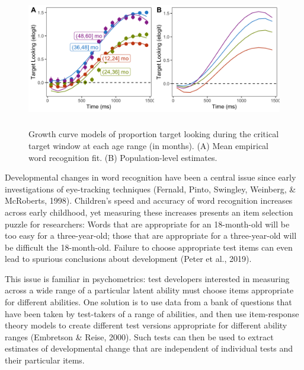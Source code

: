 \documentclass[10pt, letterpaper]{article}
\begin{document}
\begin{figure} 
\includegraphics[width=14cm,height=6cm]{../figures/age_gca.png}
\caption{Growth curve models of proportion target looking during the critical target window at each age range (in months). (A) Mean empirical word recognition fit. (B) Population-level estimates.}
\label{fig:age_gca}
\end{figure}

Developmental changes in word recognition have been a central issue
since early investigations of eye-tracking techniques (Fernald, Pinto,
Swingley, Weinberg, \& McRoberts, 1998). Children's speed and accuracy
of word recognition increases across early childhood, yet measuring
these increases presents an item selection puzzle for researchers: Words
that are appropriate for an 18-month-old will be too easy for a
three-year-old; those that are appropriate for a three-year-old will be
difficult the 18-month-old. Failure to choose appropriate test items can
even lead to spurious conclusions about development (Peter et al.,
2019).

This issue is familiar in psychometrics: test developers interested in
measuring across a wide range of a particular latent ability must choose
items appropriate for different abilities. One solution is to use data
from a bank of questions that have been taken by test-takers of a range
of abilities, and then use item-response theory models to create
different test versions appropriate for different ability ranges
(Embretson \& Reise, 2000). Such tests can then be used to extract
estimates of developmental change that are independent of individual
tests and their particular items.
\end{document}
